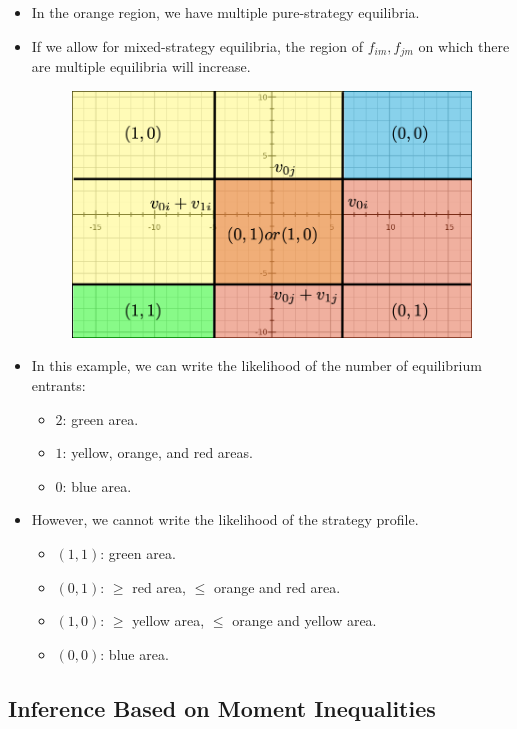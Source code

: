 \documentclass[
]{book}
\providecommand{\tightlist}{%
  \setlength{\itemsep}{0pt}\setlength{\parskip}{0pt}}
\begin{document}
\begin{itemize}
\tightlist
\item
  In the orange region, we have multiple pure-strategy equilibria.
\item
  If we allow for mixed-strategy equilibria, the region of \(f_{im}, f_{jm}\) on which there are multiple equilibria will increase.

  \begin{figure}
  \includegraphics[width=0.8\linewidth]{figuretable/bivariateentry} \end{figure}
\item
  In this example, we can write the likelihood of the number of equilibrium entrants:

  \begin{itemize}
  \tightlist
  \item
    \(2\): green area.
  \item
    \(1\): yellow, orange, and red areas.
  \item
    \(0\): blue area.
  \end{itemize}
\item
  However, we cannot write the likelihood of the strategy profile.

  \begin{itemize}
  \tightlist
  \item
    \((1, 1)\): green area.
  \item
    \((0, 1)\): \(\ge\) red area, \(\le\) orange and red area.
  \item
    \((1, 0)\): \(\ge\) yellow area, \(\le\) orange and yellow area.
  \item
    \((0, 0)\): blue area.
  \end{itemize}
\end{itemize}

\hypertarget{inference-based-on-moment-inequalities}{%
\subsection{Inference Based on Moment Inequalities}\label{inference-based-on-moment-inequalities}}
\end{document}
